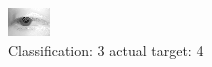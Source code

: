 \begin{figure}[h!]
\begin{center}
\includegraphics[width=0.60\columnwidth]{figures/ID2585_class_3_target_4.png}
\end{center}
\caption{ Classification: 3 actual target: 4}
\label{fig:ID2585_class_3_target_4}
\end{figure}
